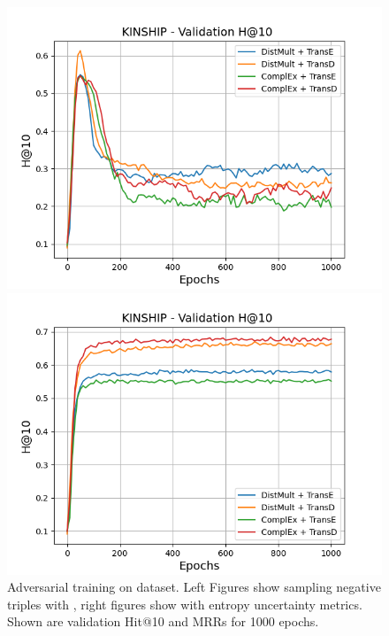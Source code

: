 \begin{figure}[H]
\begin{minipage}{.5\textwidth}
    \end{minipage}
    \begin{minipage}{.5\textwidth}
      \centering
      \includegraphics[width=0.9\linewidth]{figures/results/gan_train/not_pretrained/random/kinship/1k_epochs/random_kinship_hit10.png}
    \end{minipage}%
    \begin{minipage}{.5\textwidth}
      \centering
      \includegraphics[width=0.9\linewidth]{figures/results/gan_train/not_pretrained/uncertainty/max_distribution/entropy/kinship/1k_epochs/uncertainty_kinship_hit10.png}
    \end{minipage}%
    \caption{Adversarial training on \kinship dataset. 
    Left Figures show sampling negative triples with \origsampling, right figures show \ussoftmax with entropy uncertainty metrics.
    Shown are validation Hit@10 and MRRs for 1000 epochs.}
    \label{fig:advtrain_kinship_random_vs_uncertainty}
\end{figure}

